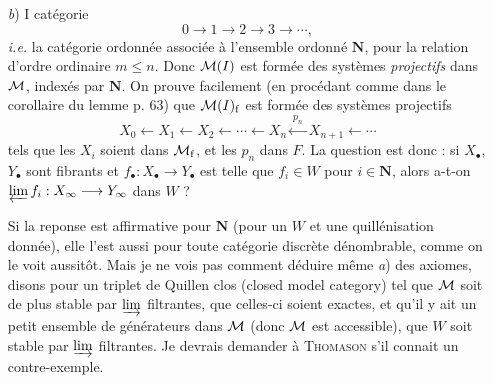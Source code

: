 \begin{enumerate}
\begin{dcomment}{status}{p72}{Products and towers have a positive answer}
The manuscript correctly observes that the tower assertion implies the countable product assertion. For a countable family $(X_n)$ of fibrant objects, put $P_r=\prod_{0\leq n\leq r}X_n$. The projection $P_{r+1}\to P_r$ is a pullback of $X_{r+1}\to e$, hence a fibration. A family of weak equivalences induces weak equivalences between the finite products, by the finite case; the inverse limit of the resulting map of towers is the original map of infinite products. This reduction proves the stated implication, although the direct product adjunction is shorter once the general lemma is recognized.

The affirmative answer does not mean that ordinary inverse limits preserve all levelwise weak equivalences. The following example shows exactly where the bonding-map condition matters. It is also a useful safeguard when replacing an abstract existence theorem by an explicit tower of complexes.
\end{dcomment}


\item[\textit{b})] I catégorie %
\[
0 \longrightarrow 1 \longrightarrow 2 \longrightarrow 3 \longrightarrow \cdots,
\]
\textit{i.e.} la catégorie ordonnée associée à l'ensemble ordonné $\mathbf{N}$, pour la relation d'ordre ordinaire $m \leq n$. Donc $\mathcal{M}(I)$ est formée des systèmes \textit{projectifs} dans $\mathcal{M}$, indexés par $\mathbf{N}$. On prouve facilement (en procédant comme dans le corollaire du lemme p. 63) que $\mathcal{M}(I)_{\mathrm{f}}$ est formée des systèmes projectifs
\[
X_0 \longleftarrow X_1 \longleftarrow X_2 \longleftarrow \cdots \longleftarrow X_n \xleftarrow{\ p_n\ } X_{n+1} \longleftarrow \cdots
\]
tels que les $X_i$ soient dans $\mathcal{M}_{\mathrm{f}}$, et les $p_n$ dans $F$. La question est donc : si $X_\bullet$, $Y_\bullet$ sont fibrants et $f_\bullet : X_\bullet \longrightarrow Y_\bullet$ est telle que $f_i \in W$ pour $i \in \mathbf{N}$, alors a-t-on $\varprojlim f_i : X_\infty \longrightarrow Y_\infty$ dans $W$ ?

Si la reponse est affirmative pour $\mathbf{N}$ (pour un $W$ et une quillénisation donnée), elle %
l'est aussi pour toute catégorie discrète dénombrable, comme on le voit aussitôt. Mais je ne vois pas comment déduire même \textit{a}) des axiomes, disons pour un triplet de Quillen clos (closed model category) tel que $\mathcal{M}$ soit de plus stable par $\varinjlim$ filtrantes, que celles-ci soient exactes, et qu'il y ait
un petit ensemble de générateurs dans $\mathcal{M}$ (donc $\mathcal{M}$ est accessible), que $W$ soit stable par $\varinjlim$ filtrantes. Je devrais demander à \textsc{Thomason} s'il connait un contre-exemple. %


\end{enumerate}

